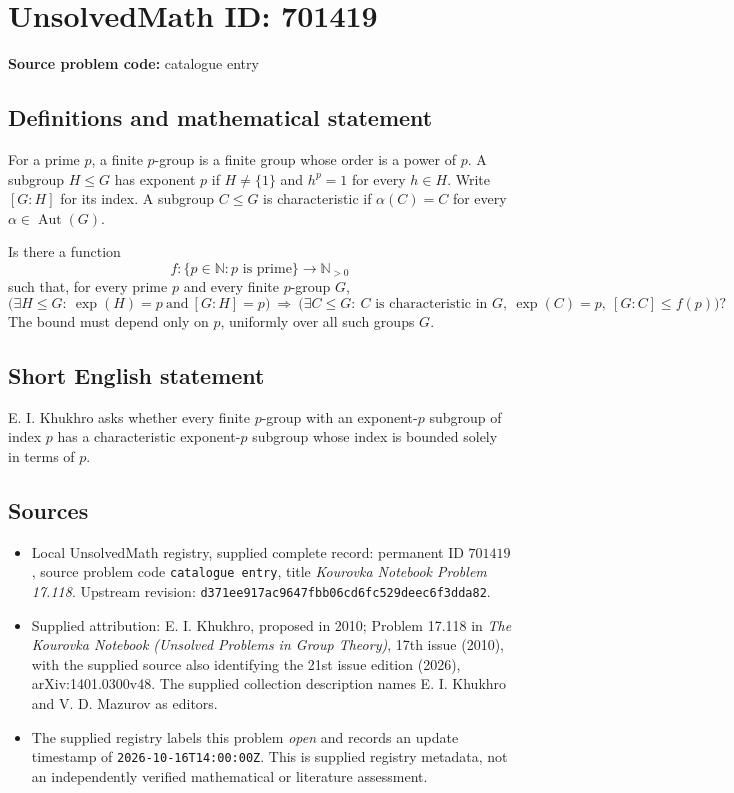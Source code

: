 \documentclass[11pt]{article}
\newcommand{\N}{\mathbb{N}}
\begin{document}
\section*{UnsolvedMath ID: 701419}
\textbf{Source problem code:} catalogue entry
\subsection{Definitions and mathematical statement}
For a prime \(p\), a finite \(p\)-group is a finite group whose order is a power of \(p\). A subgroup \(H\leq G\) has exponent \(p\) if \(H\neq\{1\}\) and \(h^p=1\) for every \(h\in H\). Write \([G:H]\) for its index. A subgroup \(C\leq G\) is characteristic if \(\alpha(C)=C\) for every \(\alpha\in\operatorname{Aut}(G)\).

Is there a function
\[
f:\{p\in\N:p\text{ is prime}\}\longrightarrow\N_{>0}
\]
such that, for every prime \(p\) and every finite \(p\)-group \(G\),
\[
\bigl(\exists H\leq G:\ \exp(H)=p\ \text{and}\ [G:H]=p\bigr)
\ \Longrightarrow\
\bigl(\exists C\leq G:\ C\text{ is characteristic in }G,\ \exp(C)=p,\ [G:C]\leq f(p)\bigr)?
\]
The bound must depend only on \(p\), uniformly over all such groups \(G\).
\subsection{Short English statement}
E. I. Khukhro asks whether every finite \(p\)-group with an exponent-\(p\) subgroup of index \(p\) has a characteristic exponent-\(p\) subgroup whose index is bounded solely in terms of \(p\).
\subsection{Sources}
\begin{itemize}
\item Local UnsolvedMath registry, supplied complete record: permanent ID \(701419\), source problem code \texttt{catalogue entry}, title \emph{Kourovka Notebook Problem 17.118}. Upstream revision: \texttt{d371ee917ac9647fbb06cd6fc529deec6f3dda82}.
\item Supplied attribution: E. I. Khukhro, proposed in 2010; Problem 17.118 in \emph{The Kourovka Notebook (Unsolved Problems in Group Theory)}, 17th issue (2010), with the supplied source also identifying the 21st issue edition (2026), arXiv:1401.0300v48. The supplied collection description names E. I. Khukhro and V. D. Mazurov as editors.
\item The supplied registry labels this problem \emph{open} and records an update timestamp of \texttt{2026-10-16T14:00:00Z}. This is supplied registry metadata, not an independently verified mathematical or literature assessment.
\end{itemize}
\end{document}
